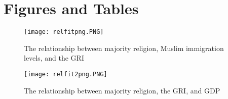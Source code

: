 \documentclass[12pt,english]{article}
\begin{document}
\section*{Figures and Tables}\label{sec:figTables}
\begin{figure}[ht]
\centering
\bigskip{}
\texttt{[image: relfitpng.PNG]}
\caption{The relationship between majority religion, Muslim immigration levels, and the GRI}
\label{fig:fig1}
\end{figure}

\begin{figure}[ht]
\centering
\bigskip{}
\texttt{[image: relfit2png.PNG]}
\caption{The relationship between majority religion, the GRI, and GDP}
\label{fig:fig2}
\end{figure}
\end{document}

